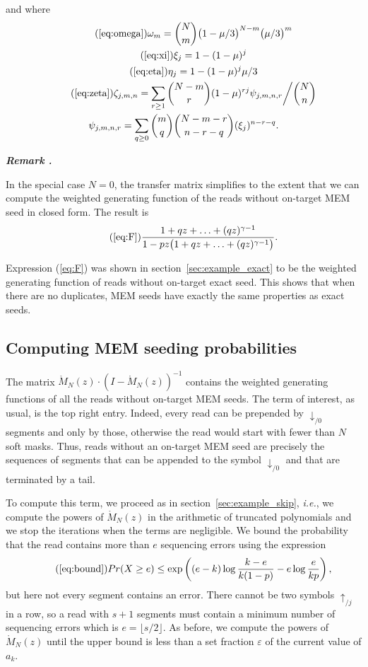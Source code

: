 \documentclass{article}
\newcounter{remarkcounter}
\newenvironment{remark}
{\small\it\vspace{0.5\baselineskip}
  \refstepcounter{remarkcounter}%
  \noindent\textbf{Remark \arabic{remarkcounter}.}%
}{\vspace{0.5\baselineskip}}
\begin{document}
and where
\begin{gather}
\tag{\ref{eq:omega}}
\omega_m = {N \choose m} \big(1 - \mu/3\big)^{N-m} \big(\mu/3\big)^m \\
\tag{\ref{eq:xi}}
\xi_j = 1-(1-\mu)^j \\
\tag{\ref{eq:eta}}
\eta_j = 1-(1-\mu)^j\mu/3 \\
\tag{\ref{eq:zeta}}
\zeta_{j,m,n} = \sum_{r\geq1} {N-m \choose r}
(1-\mu)^{rj} \psi_{j,m,n,r} \bigg/ {N \choose n} \\
\notag
\psi_{j,m,n,r} = \sum_{q \geq 0}{m \choose q}{N-m-r \choose n-r-q}
(\xi_j)^{n-r-q}.
\end{gather}

\begin{remark}
In the special case $N=0$, the transfer matrix simplifies to the extent
that we can compute the weighted generating function of the reads without
on-target MEM seed in closed form. The result is
\begin{equation}
\tag{\ref{eq:F}}
\frac{1+qz+\ldots+(qz)^{\gamma-1}}
  {1-pz \big(1+qz+\ldots+(qz)^{\gamma-1} \big)}.
\end{equation}

Expression (\ref{eq:F}) was shown in section~\ref{sec:example_exact} to be
the weighted generating function of reads without on-target exact seed.
This shows that when there are no duplicates, MEM seeds have exactly the
same properties as exact seeds.
\end{remark}

\subsection{Computing MEM seeding probabilities}

The matrix $\mathring{M}_N(z)\cdot(I-\mathring{M}_N(z))^{-1}$ contains the
weighted generating functions of all the reads without on-target MEM
seeds. The term of interest, as usual, is the top right entry. Indeed,
every read can be prepended by $\downarrow_{/0}$ segments and only by
those, otherwise the read would start with fewer than $N$ soft masks.
Thus, reads without an on-target MEM seed are precisely the sequences of
segments that can be appended to the symbol $\downarrow_{/0}$ and that are
terminated by a tail.

To compute this term, we proceed as in section~\ref{sec:example_skip},
\textit{i.e.}, we compute the powers of $\mathring{M}_N(z)$ in the
arithmetic of truncated polynomials and we stop the iterations when the
terms are negligible. We bound the probability that the read contains more
than $e$ sequencing errors using the expression
\begin{equation*}
\tag{\ref{eq:bound}}
Pr(X \geq e) \leq \exp \left( (e-k)\log \frac{k-e}{k(1-p)} -e\log
\frac{e}{kp} \right),
\end{equation*}
but here not every segment contains an error. There cannot be two symbols
$\uparrow_{/j}$ in a row, so a read with $s+1$ segments must contain a
minimum number of sequencing errors which is $e=\lfloor{s/2\rfloor}$. As
before, we compute the powers of $\mathring{M}_N(z)$ until the upper bound
is less than a set fraction $\varepsilon$ of the current value of $a_k$.
\end{document}
